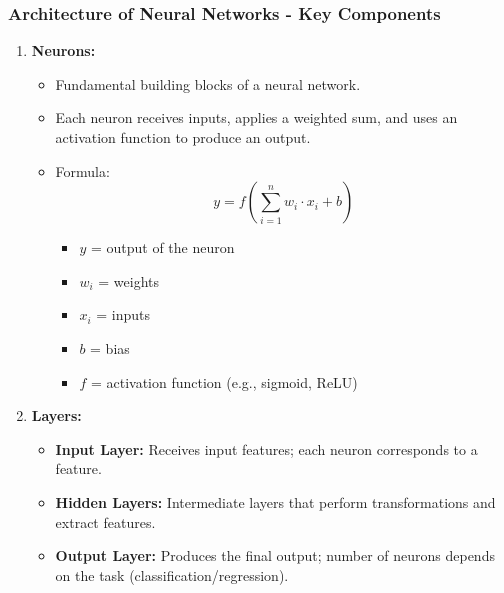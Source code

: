 \documentclass[aspectratio=169]{beamer}
\begin{document}
\begin{frame}[fragile]
    \frametitle{Architecture of Neural Networks - Key Components}
    \begin{enumerate}
        \item \textbf{Neurons:}
        \begin{itemize}
            \item Fundamental building blocks of a neural network.
            \item Each neuron receives inputs, applies a weighted sum, and uses an activation function to produce an output.
            \item Formula: 
            \[
            y = f\left(\sum_{i=1}^{n} w_i \cdot x_i + b\right)
            \]
            \begin{itemize}
                \item \( y \) = output of the neuron
                \item \( w_i \) = weights
                \item \( x_i \) = inputs
                \item \( b \) = bias
                \item \( f \) = activation function (e.g., sigmoid, ReLU)
            \end{itemize}
        \end{itemize}

        \item \textbf{Layers:}
        \begin{itemize}
            \item \textbf{Input Layer:} Receives input features; each neuron corresponds to a feature.
            \item \textbf{Hidden Layers:} Intermediate layers that perform transformations and extract features.
            \item \textbf{Output Layer:} Produces the final output; number of neurons depends on the task (classification/regression).
        \end{itemize}
    \end{enumerate}
\end{frame}
\end{document}
